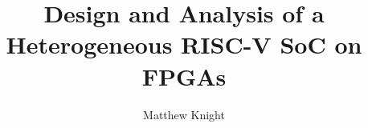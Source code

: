
\author{Matthew Knight}
\title{Design and Analysis of a \mbox{Heterogeneous} RISC-V SoC on FPGAs}

